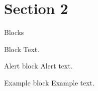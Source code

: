 \documentclass{beamer}
\begin{document}
    \section{Section 2}
    \begin{frame}{Blocks}
        \begin{block}{Block}
            Text.
        \end{block}
        \pause
        \begin{alertblock}{Alert block}
            Alert \alert{text}.
        \end{alertblock}
        \pause
        \begin{exampleblock}{Example block}
            Example \textcolor{example}{text}.
        \end{exampleblock}
    \end{frame}
    
\end{document}
